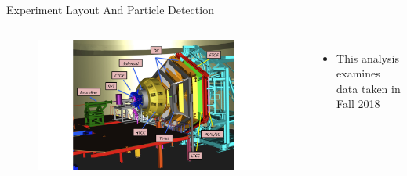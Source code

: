 \documentclass[aspectratio=169]{beamer}
\newcommand*{\myfont}{\fontfamily{lmtt}\selectfont}
\begin{document}
\begin{frame}{Experiment Layout And Particle Detection}
\begin{columns}[t, onlytextwidth]
                \vspace{0.3cm}
                \begin{figure}[t!]
                    \includegraphics[trim={8cm 1cm  8cm 1cm},width=.899\textwidth]{DNP/jlab_clas_layout_1.png}
                    

                    
                \end{figure}
                \begin{itemize}
                    \setlength\itemsep{.35em}
                    \item This analysis examines data taken in Fall 2018
                    \end{itemize}
                {\myfont{\tiny V. Burkert et al., NIMA, 959, 163419 (2020) }}
        \end{columns}
\end{frame}    




\end{document}
